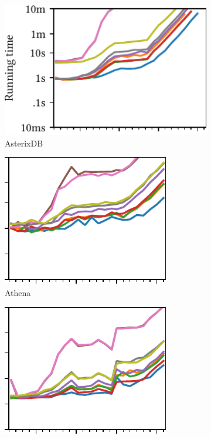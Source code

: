 \documentclass[sigconf,nonacm,natbib=false,screen]{acmart}
\begin{document}
\begin{figure}
  ~\hspace{1em}
  \begin{subfigure}[t]{.25\linewidth}
    \includegraphics[scale=.7]{scaling-running-time-asterixdb}%
    \hfill
    \vspace{-1ex}
    \caption{AsterixDB\hspace{-3em}~}
    \label{fig:scaling-running-time:asterixdb}
  \end{subfigure}
  \begin{subfigure}[t]{.2\linewidth}
    \includegraphics[scale=.7]{scaling-running-time-athena-v2}%
    \hfill
    \vspace{-1ex}
    \caption{Athena}
    \label{fig:scaling-running-time:athena-v2}
  \end{subfigure}
  \begin{subfigure}[t]{.2\linewidth}
    \includegraphics[scale=.7]{scaling-running-time-bigquery}%

\end{subfigure}
\end{figure}
\end{document}
